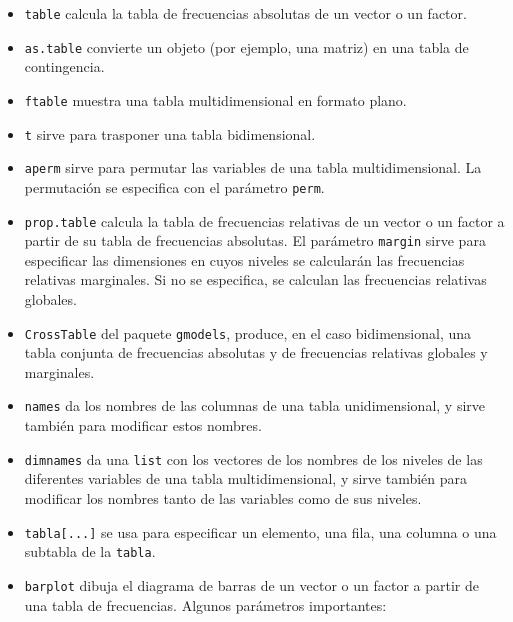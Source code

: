 \documentclass[]{book}
\providecommand{\tightlist}{%
  \setlength{\itemsep}{0pt}\setlength{\parskip}{0pt}}
\theoremstyle{definition}
\theoremstyle{definition}
\theoremstyle{definition}
\theoremstyle{remark}
\begin{document}
\begin{itemize}
\tightlist
\item
  \texttt{table} calcula la tabla de frecuencias absolutas de un vector o un factor.
\item
  \texttt{as.table} convierte un objeto (por ejemplo, una matriz) en una tabla de contingencia.
\item
  \texttt{ftable} muestra una tabla multidimensional en formato plano.
\item
  \texttt{t} sirve para trasponer una tabla bidimensional.
\item
  \texttt{aperm} sirve para permutar las variables de una tabla multidimensional. La permutación se especifica con el parámetro \texttt{perm}.
\item
  \texttt{prop.table} calcula la tabla de frecuencias relativas de un vector o un factor a partir de su tabla de frecuencias absolutas. El parámetro \texttt{margin} sirve para especificar las dimensiones en cuyos niveles se calcularán las frecuencias relativas marginales. Si no se especifica, se calculan las frecuencias relativas globales.
\item
  \texttt{CrossTable} del paquete \texttt{gmodels}, produce, en el caso bidimensional, una tabla conjunta de frecuencias absolutas y de frecuencias relativas globales y marginales.
\item
  \texttt{names} da los nombres de las columnas de una tabla unidimensional, y sirve también para modificar estos nombres.
\item
  \texttt{dimnames} da una \texttt{list} con los vectores de los nombres de los niveles de las diferentes variables de una tabla multidimensional, y sirve también para modificar los nombres tanto de las variables como de sus niveles.
\item
  \texttt{tabla{[}...{]}} se usa para especificar un elemento, una fila, una columna o una subtabla de la \texttt{tabla}.
\item
  \texttt{barplot} dibuja el diagrama de barras de un vector o un factor a partir de una tabla de frecuencias. Algunos parámetros importantes:


\end{itemize}
\end{document}
